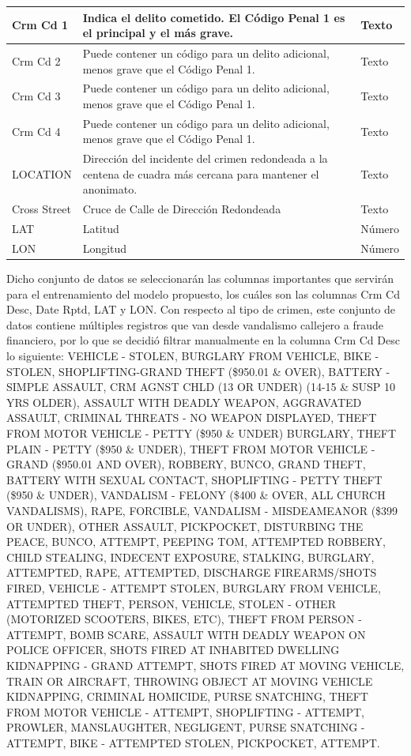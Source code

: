 \begin{longtable}{|p{2.5cm}|p{6cm}|p{5cm}|}
	Crm Cd 1 & Indica el delito cometido. El Código Penal 1 es el principal y el más grave. & Texto \\
	\hline
	Crm Cd 2 & Puede contener un código para un delito adicional, menos grave que el Código Penal 1. & Texto \\
	\hline
	Crm Cd 3 & Puede contener un código para un delito adicional, menos grave que el Código Penal 1. & Texto \\
	\hline
	Crm Cd 4 & Puede contener un código para un delito adicional, menos grave que el Código Penal 1. & Texto \\
	\hline
	LOCATION & Dirección del incidente del crimen redondeada a la centena de cuadra más cercana para mantener el anonimato. & Texto \\
	\hline
	Cross Street & Cruce de Calle de Dirección Redondeada & Texto \\
	\hline
	LAT & Latitud & Número \\
	\hline
	LON & Longitud & Número \\
	\hline
\end{longtable}

Dicho conjunto de datos se seleccionarán las columnas importantes que servirán para el entrenamiento del modelo propuesto, los cuáles son las columnas Crm Cd Desc, Date Rptd, LAT y LON. Con respecto al tipo de crimen, este conjunto de datos contiene múltiples registros que van desde vandalismo callejero a fraude financiero, por lo que se decidió filtrar manualmente en la columna Crm Cd Desc lo siguiente: VEHICLE - STOLEN, BURGLARY FROM VEHICLE, BIKE - STOLEN, SHOPLIFTING-GRAND THEFT (\$950.01 \& OVER), BATTERY - SIMPLE ASSAULT, CRM AGNST CHLD (13 OR UNDER) (14-15 \& SUSP 10 YRS OLDER), ASSAULT WITH DEADLY WEAPON, AGGRAVATED ASSAULT,	CRIMINAL THREATS - NO WEAPON DISPLAYED, THEFT FROM MOTOR VEHICLE - PETTY (\$950 \& UNDER)	BURGLARY, THEFT PLAIN - PETTY (\$950 \& UNDER), THEFT FROM MOTOR VEHICLE - GRAND (\$950.01 AND OVER), ROBBERY, BUNCO, GRAND THEFT, BATTERY WITH SEXUAL CONTACT, SHOPLIFTING - PETTY THEFT (\$950 \& UNDER), VANDALISM - FELONY (\$400 \& OVER, ALL CHURCH VANDALISMS), RAPE, FORCIBLE, VANDALISM - MISDEAMEANOR (\$399 OR UNDER), OTHER ASSAULT, PICKPOCKET, DISTURBING THE PEACE, BUNCO, ATTEMPT, PEEPING TOM, ATTEMPTED ROBBERY, CHILD STEALING, INDECENT EXPOSURE, STALKING, BURGLARY, ATTEMPTED, RAPE, ATTEMPTED, DISCHARGE FIREARMS/SHOTS FIRED, VEHICLE - ATTEMPT STOLEN, BURGLARY FROM VEHICLE, ATTEMPTED	THEFT, PERSON, VEHICLE, STOLEN - OTHER (MOTORIZED SCOOTERS, BIKES, ETC), THEFT FROM PERSON - ATTEMPT, BOMB SCARE, ASSAULT WITH DEADLY WEAPON ON POLICE OFFICER, SHOTS FIRED AT INHABITED DWELLING	KIDNAPPING - GRAND ATTEMPT, SHOTS FIRED AT MOVING VEHICLE, TRAIN OR AIRCRAFT, THROWING OBJECT AT MOVING VEHICLE	KIDNAPPING, CRIMINAL HOMICIDE, PURSE SNATCHING, THEFT FROM MOTOR VEHICLE - ATTEMPT, SHOPLIFTING - ATTEMPT, PROWLER, MANSLAUGHTER, NEGLIGENT, PURSE SNATCHING - ATTEMPT, BIKE - ATTEMPTED STOLEN, PICKPOCKET, ATTEMPT.

